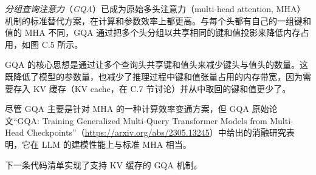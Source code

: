 \emph{分组查询注意力}（\emph{GQA}）已成为原始多头注意力（multi-head attention, MHA）机制的标准替代方案，在计算和参数效率上都更高。与每个头都有自己的一组键和值的 MHA 不同，GQA 通过把多个头分组以共享相同的键和值投影来降低内存占用，如图 C.5 所示。


GQA 的核心思想是通过让多个查询头共享键和值头来减少键头与值头的数量。这既降低了模型的参数量，也减少了推理过程中键和值张量占用的内存带宽，因为需要存入 KV 缓存（KV cache，在 C.7 节讨论）并从中取回的键和值更少了。

尽管 GQA 主要是针对 MHA 的一种计算效率变通方案，但 GQA 原始论文“GQA: Training Generalized Multi-Query Transformer Models from Multi-Head Checkpoints”（\href{https://arxiv.org/abs/2305.13245}{https://arxiv.org/abs/2305.13245}）中给出的消融研究表明，它在 LLM 的建模性能上与标准 MHA 相当。

下一条代码清单实现了支持 KV 缓存的 GQA 机制。

